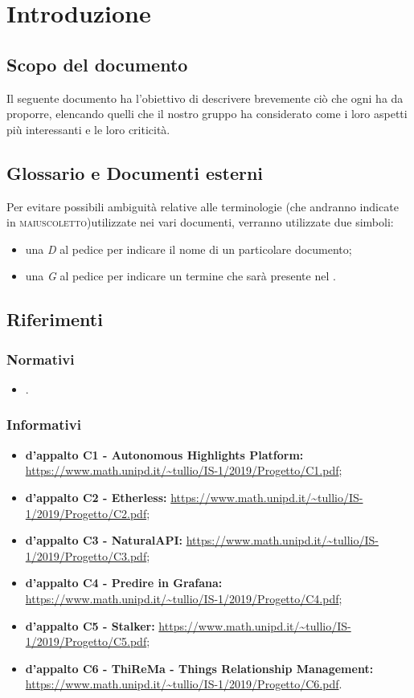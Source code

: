 
\section{Introduzione}
\subsection{Scopo del documento}
  Il seguente documento ha l'obiettivo di descrivere brevemente ciò che ogni   ha da proporre, elencando quelli che il nostro gruppo ha considerato come i loro aspetti più interessanti e le loro criticità.
\subsection{Glossario e Documenti esterni}
    Per evitare possibili ambiguità relative alle terminologie (che andranno indicate in \textsc{maiuscoletto})utilizzate nei vari documenti, verranno utilizzate due simboli:
    \begin{itemize}
      \item una \textit{D} al pedice per indicare il nome di un particolare documento;
      \item una \textit{G} al pedice per indicare un termine che sarà presente nel .
    \end{itemize}
\subsection{Riferimenti}
    \subsubsection{Normativi}
    \begin{itemize}
      \item \textbf{}.
    \end{itemize}
    \subsubsection{Informativi}
    \begin{itemize}
      \item \textbf{ d'appalto C1 - Autonomous Highlights Platform:} \url{https://www.math.unipd.it/~tullio/IS-1/2019/Progetto/C1.pdf};
      \item \textbf{ d'appalto C2 - Etherless:} \url{https://www.math.unipd.it/~tullio/IS-1/2019/Progetto/C2.pdf};
      \item \textbf{ d'appalto C3 - NaturalAPI:} \url{https://www.math.unipd.it/~tullio/IS-1/2019/Progetto/C3.pdf};
      \item \textbf{ d'appalto C4 - Predire in Grafana:} \url{https://www.math.unipd.it/~tullio/IS-1/2019/Progetto/C4.pdf};
      \item \textbf{ d'appalto C5 - Stalker:} \url{https://www.math.unipd.it/~tullio/IS-1/2019/Progetto/C5.pdf};
      \item \textbf{ d'appalto C6 - ThiReMa - Things Relationship Management:} \url{https://www.math.unipd.it/~tullio/IS-1/2019/Progetto/C6.pdf}.
    \end{itemize}
